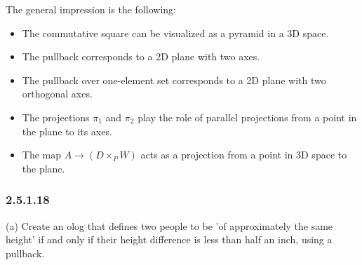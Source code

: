 \documentclass{article}
\newcommand{\exercise}[1]{\subsubsection*{#1}}
\begin{document}
The general impression is the following:
\begin{itemize}
  \item The commutative square can be visualized as a pyramid in a 3D space.
  \item The pullback corresponds to a 2D plane with two axes.
  \item The pullback over one-element set corresponds to a 2D plane with two orthogonal axes.
  \item The projections $\pi_1$ and $\pi_2$ play the role of parallel
        projections from a point in the plane to its axes.
  \item The map $A \to (D \times_P W)$ acts as a projection from a point in 3D space to the plane.
\end{itemize}

\begin{center}
\end{center}

\exercise{2.5.1.18}

(a) Create an olog that defines two people to be 'of approximately the same
height' if and only if their height difference is less than half an inch, using
a pullback.
\end{document}
